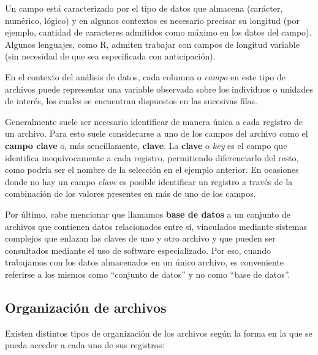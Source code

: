 \documentclass[
]{book}
\begin{document}
Un campo está caracterizado por el tipo de datos que almacena (carácter, numérico, lógico) y en algunos contextos es necesario precisar su longitud (por ejemplo, cantidad de caracteres admitidos como máximo en los datos del campo). Algunos lenguajes, como R, admiten trabajar con campos de longitud variable (sin necesidad de que sea especificada con anticipación).

En el contexto del análisis de datos, cada columna o \emph{campo} en este tipo de archivos puede representar una variable observada sobre los individuos o unidades de interés, los cuales se encuentran dispuestos en las sucesivas filas.

Generalmente suele ser necesario identificar de manera única a cada registro de un archivo. Para esto suele considerarse a uno de los campos del archivo como el \textbf{campo clave} o, más sencillamente, \textbf{clave}. La \textbf{clave} o \emph{key} es el campo que identifica inequívocamente a cada registro, permitiendo diferenciarlo del resto, como podría ser el nombre de la selección en el ejemplo anterior. En ocasiones donde no hay un campo \emph{clave} es posible identificar un registro a través de la combinación de los valores presentes en más de uno de los campos.

Por último, cabe mencionar que llamamos \textbf{base de datos} a un conjunto de archivos que contienen datos relacionados entre sí, vinculados mediante sistemas complejos que enlazan las claves de uno y otro archivo y que pueden ser consultados mediante el uso de software especializado. Por eso, cuando trabajamos con los datos almacenados en un único archivo, es conveniente referirse a los mismos como ``conjunto de datos'' y no como ``base de datos''.

\hypertarget{organizaciuxf3n-de-archivos}{%
\subsection{Organización de archivos}\label{organizaciuxf3n-de-archivos}}

Existen distintos tipos de organización de los archivos según la forma en la que se pueda acceder a cada uno de sus registros:
\end{document}
